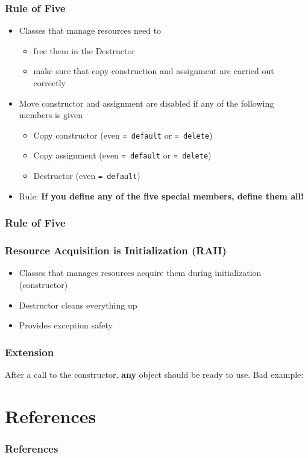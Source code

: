\documentclass[usenames,dvipsnames,svgnames,table,aspectratio=169]{beamer}
\begin{document}
\begin{frame}
    \frametitle{Rule of Five}
    \begin{itemize}
        \item<+-> Classes that manage resources need to
        \begin{itemize}
            \item<+-> free them in the Destructor
            \item<+-> make sure that copy construction and assignment are carried out correctly
        \end{itemize}
        \item<+-> Move constructor and assignment are disabled if any of the following members is given
        \begin{itemize}
            \item<+-> Copy constructor (even \lstinline|= default| or \lstinline|= delete|)
            \item<+-> Copy assignment (even \lstinline|= default| or \lstinline|= delete|)
            \item<+-> Destructor (even \lstinline|= default|)
        \end{itemize}
        \item<+-> Rule: \textbf{If you define any of the five special members, define them all!}
    \end{itemize}
\end{frame}

\begin{frame}
    \frametitle{Rule of Five}
    
\end{frame}


\begin{frame}
    \frametitle{Resource Acquisition is Initialization (RAII)}
    \begin{itemize}
        \item<+-> Classes that manages resources acquire them during initialization (constructor)
        \item<+-> Destructor cleans everything up
        \item<+-> Provides exception safety
    \end{itemize}
    \only<+->{}
\end{frame}

\begin{frame}
    \frametitle{Extension}
    After a call to the constructor, \textbf{any} object should be ready to use. Bad example:
    \pause
    
\end{frame}

\section*{References}
\begin{frame}
  \frametitle{References}
  \printbibliography
\end{frame}
\end{document}
